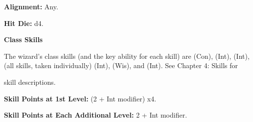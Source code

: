 
\textbf{Alignment:} Any.

\textbf{Hit Die:} d4.

\textbf{Class Skills}

The wizard's class skills (and the key ability for each skill) are  
(Con),  (Int),  (Int),  (all skills, taken individually) 
(Int),  (Wis), and  (Int). See Chapter 4: Skills for

skill descriptions.

\textbf{Skill Points at 1st Level:} (2 + Int modifier) x4.

\textbf{Skill Points at Each Additional Level:} 2 + Int modifier.

